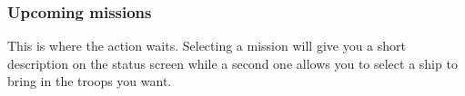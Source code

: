 \subsubsection{Upcoming missions}
This is where the action waits. Selecting a mission will give you a short description on the status screen while a second one allows you to select a ship to bring in the troops you want.
